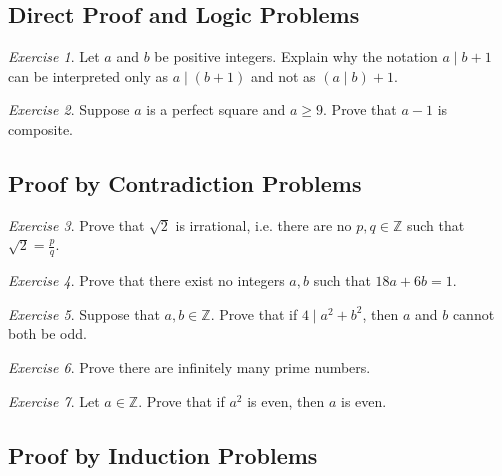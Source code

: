 \documentclass[11pt]{article}
\newcommand{\Z}{\ensuremath{\mathbb Z}}
\theoremstyle{plain}
\theoremstyle{definition}
\theoremstyle{remark}
\newtheorem{exc}{Exercise}[section]
\begin{document}
\subsection{Direct Proof and Logic Problems}

\begin{exc}
    Let $a$ and $b$ be positive integers. Explain why the notation $a \mid b+1$ can be interpreted only as $a \mid (b+1)$ and not as $(a \mid b) + 1$.
\end{exc}
\begin{exc}
    Suppose $a$ is a perfect square and $a \geq 9$. Prove that $a-1$ is composite.
\end{exc}

\subsection{Proof by Contradiction Problems}

\begin{exc}
    Prove that $\sqrt{2}$ is irrational, i.e. there are no $p, q \in \Z$ such that $\sqrt{2} = \frac{p}{q}$.
\end{exc}
\begin{exc}
    Prove that there exist no integers $a, b$ such that $18a + 6b = 1$.
\end{exc}
\begin{exc}
    Suppose that $a, b \in \Z$. Prove that if $4 \mid a^2 + b^2$, then $a$ and $b$ cannot both be odd.
\end{exc}
\begin{exc}
    Prove there are infinitely many prime numbers.
\end{exc}
\begin{exc}
    Let $a \in \Z$. Prove that if $a^2$ is even, then $a$ is even.
\end{exc}

\subsection{Proof by Induction Problems}
\end{document}

